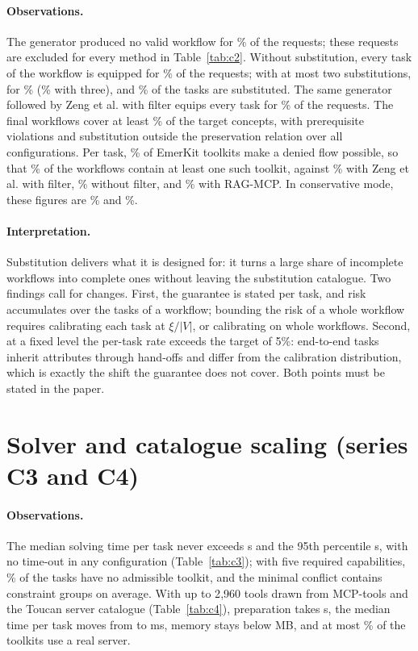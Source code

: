 \documentclass[10pt]{article}
\begin{document}
\paragraph{Observations.} The generator produced no valid workflow for \RCtwoNoWf\% of the requests; these requests are excluded for every method in Table~\ref{tab:c2}. Without substitution, every task of the workflow is equipped for \RCtwoAllZero\% of the requests; with at most two substitutions, for \RCtwoAllTwo\% (\RCtwoAllThree\% with three), and \RCtwoSub\% of the tasks are substituted. The same generator followed by Zeng et al. with filter equips every task for \RCtwoZfAll\% of the requests. The final workflows cover at least \RCtwoObjMin\% of the target concepts, with \RCtwoPrereq{} prerequisite violations and \RCtwoPres{} substitution outside the preservation relation over all configurations. Per task, \RCtwoTaskDfr\% of EmerKit toolkits make a denied flow possible, so that \RCtwoWfRisk\% of the workflows contain at least one such toolkit, against \RCtwoZfRisk\% with Zeng et al. with filter, \RCtwoZRisk\% without filter, and \RCtwoRagRisk\% with RAG-MCP. In conservative mode, these figures are \RCtwoWfRiskCons\% and \RCtwoAllCons\%.
\paragraph{Interpretation.} Substitution delivers what it is designed for: it turns a large share of incomplete workflows into complete ones without leaving the substitution catalogue. Two findings call for changes. First, the guarantee is stated per task, and risk accumulates over the tasks of a workflow; bounding the risk of a whole workflow requires calibrating each task at $\xi/|V|$, or calibrating on whole workflows. Second, at a fixed level the per-task rate exceeds the target of 5\%: end-to-end tasks inherit attributes through hand-offs and differ from the calibration distribution, which is exactly the shift the guarantee does not cover. Both points must be stated in the paper.

\section{Solver and catalogue scaling (series C3 and C4)}
\paragraph{Observations.} The median solving time per task never exceeds \RCthreeMedMax{} s and the 95th percentile \RCthreePmax{} s, with no time-out in any configuration (Table~\ref{tab:c3}); with five required capabilities, \RCthreeInfFive\% of the tasks have no admissible toolkit, and the minimal conflict contains \RCthreeConf{} constraint groups on average. With up to 2{,}960 tools drawn from MCP-tools and the Toucan server catalogue (Table~\ref{tab:c4}), preparation takes \RCfourPrep{} s, the median time per task moves from \RCfourEmkSmall{} to \RCfourEmkLarge{} ms, memory stays below \RCfourMem{} MB, and at most \RCfourReal\% of the toolkits use a real server.
\end{document}

